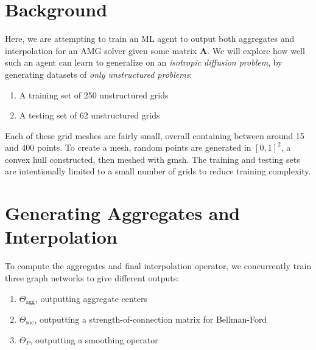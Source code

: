 \documentclass{article}
\newcommand{\mat}[1]{\bm{{#1}}}
\begin{document}
\section{Background}
Here, we are attempting to train an ML agent to output both aggregates and interpolation for an AMG solver given some matrix $\mat{A}$.  We will explore how well such an agent can learn to generalize on an \textit{isotropic diffusion problem}, by generating datasets of \textit{only unstructured problems}:
\begin{enumerate}
\item A training set of 250 unstructured grids
\item A testing set of 62 unstructured grids
\end{enumerate}
Each of these grid meshes are fairly small, overall containing between around 15 and 400 points.  To create a mesh, random points are generated in $\left[0,1\right]^2$, a convex hull constructed, then meshed with gmsh.  The training and testing sets are intentionally limited to a small number of grids to reduce training complexity.

\section{Generating Aggregates and Interpolation}
To compute the aggregates and final interpolation operator, we concurrently train three graph networks to give different outputs:
\begin{enumerate}
\item $\Theta_{\text{agg}}$, outputting aggregate centers
\item $\Theta_{\text{soc}}$, outputting a strength-of-connection matrix for Bellman-Ford
\item $\Theta_{P}$, outputting a smoothing operator
\end{enumerate}
\end{document}
